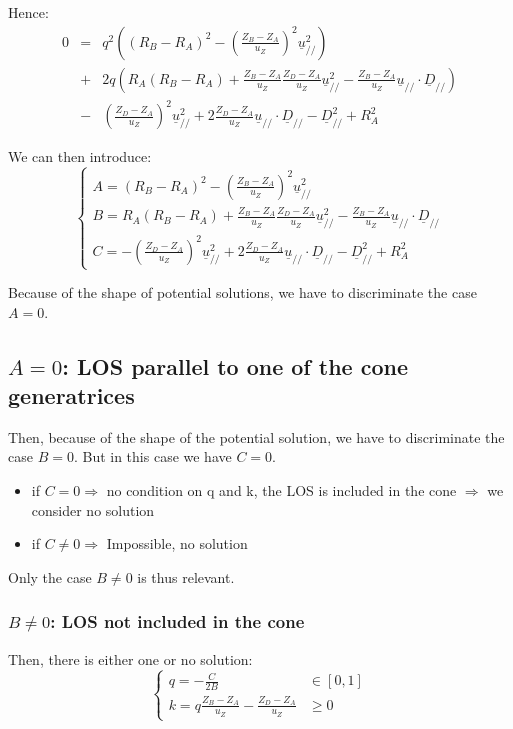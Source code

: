 \documentclass[a4paper,11pt,twoside,titlepage,openright]{book}
\numberwithin{equation}{section}
\newcommand{\ud}[1]{\underline{#1}}
\begin{document}
Hence:
$$
\begin{array}{lll}
0 &=& q^2\left( (R_B-R_A)^2 - \left(\frac{Z_B-Z_A}{u_Z}\right)^2\ud{u}_{//}^2 \right)\\
& + & 2q\left( R_A(R_B-R_A) + \frac{Z_B-Z_A}{u_Z}\frac{Z_D-Z_A}{u_Z}\ud{u}_{//}^2 - \frac{Z_B-Z_A}{u_Z}\ud{u}_{//}\cdot\ud{D}_{//}  \right)\\
& - & \left(\frac{Z_D-Z_A}{u_Z}\right)^2\ud{u}_{//}^2 + 2\frac{Z_D-Z_A}{u_Z}\ud{u}_{//}\cdot\ud{D}_{//} - \ud{D}_{//}^2 + R_A^2
\end{array}
$$

We can then introduce:
$$
\left\{
\begin{array}{ll}
A = (R_B-R_A)^2 - \left(\frac{Z_B-Z_A}{u_Z}\right)^2\ud{u}_{//}^2\\
B = R_A(R_B-R_A) + \frac{Z_B-Z_A}{u_Z}\frac{Z_D-Z_A}{u_Z}\ud{u}_{//}^2 - \frac{Z_B-Z_A}{u_Z}\ud{u}_{//}\cdot\ud{D}_{//}\\
C = -\left(\frac{Z_D-Z_A}{u_Z}\right)^2\ud{u}_{//}^2 + 2\frac{Z_D-Z_A}{u_Z}\ud{u}_{//}\cdot\ud{D}_{//} - \ud{D}_{//}^2 + R_A^2
\end{array}
\right.
$$

Because of the shape of potential solutions, we have to discriminate the case $A=0$.

\subsection{$A=0$: LOS parallel to one of the cone generatrices}

Then, because of the shape of the potential solution, we have to discriminate the case $B=0$.
But in this case we have $C=0$.
\begin{itemize}
\item if $C=0 \Rightarrow$ no condition on q and k, the LOS is included in the cone $\Rightarrow$ we consider no solution
\item if $C\neq 0 \Rightarrow$ Impossible, no solution
\end{itemize}

Only the case $B\neq 0$ is thus relevant.

\subsubsection{$B\neq0$: LOS not included in the cone}

Then, there is either one or no solution:
$$
\left\{
\begin{array}{ll}
q = -\frac{C}{2B} & \in [0,1]\\
k = q\frac{Z_B-Z_A}{u_Z} - \frac{Z_D-Z_A}{u_Z} & \geq 0
\end{array}
\right.
$$
\end{document}
